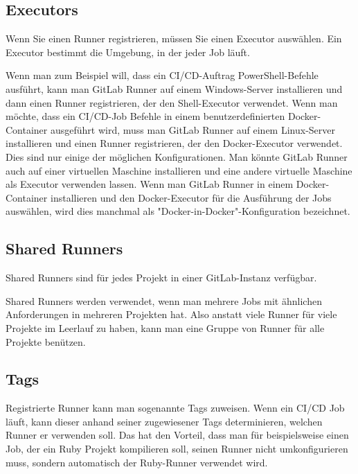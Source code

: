 \subsection{Executors} \label{sssec:lblExecutor}

Wenn Sie einen Runner registrieren, müssen Sie einen Executor auswählen. Ein Executor bestimmt die Umgebung, in der jeder Job läuft.\autocite{gitlabRunner}

Wenn man zum Beispiel will, dass ein CI/CD-Auftrag PowerShell-Befehle ausführt, kann man GitLab Runner auf einem Windows-Server installieren und dann einen Runner registrieren, der den Shell-Executor verwendet.
Wenn man möchte, dass ein CI/CD-Job Befehle in einem benutzerdefinierten Docker-Container ausgeführt wird, muss man GitLab Runner auf einem Linux-Server installieren und einen Runner registrieren, der den Docker-Executor verwendet.
Dies sind nur einige der möglichen Konfigurationen. Man könnte GitLab Runner auch auf einer virtuellen Maschine installieren und eine andere virtuelle Maschine als Executor verwenden lassen.
Wenn man GitLab Runner in einem Docker-Container installieren und den Docker-Executor für die Ausführung der Jobs auswählen, wird dies manchmal als "Docker-in-Docker"-Konfiguration bezeichnet.\autocite{gitlabRunner}

\subsection{Shared Runners}

Shared Runners sind für jedes Projekt in einer GitLab-Instanz verfügbar.

Shared Runners werden verwendet, wenn man mehrere Jobs mit ähnlichen Anforderungen in mehreren Projekten hat. Also anstatt viele Runner für viele Projekte im Leerlauf zu haben, kann man eine Gruppe von Runner für alle Projekte benützen.\autocite{gitlabSharedRunner}

\subsection{Tags}

Registrierte Runner kann man sogenannte Tags zuweisen. Wenn ein CI/CD Job läuft, kann dieser anhand seiner zugewiesener Tags determinieren, welchen Runner er verwenden soll. Das hat den Vorteil, dass man für beispielsweise einen Job, der ein Ruby Projekt kompilieren soll, seinen Runner nicht umkonfigurieren muss, sondern automatisch der Ruby-Runner verwendet wird.

